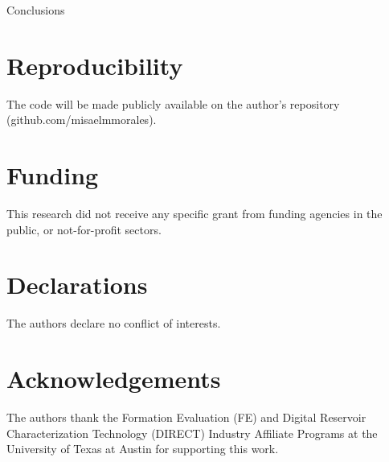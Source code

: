 \documentclass[10pt, twoside]{article}
\begin{document}
Conclusions

\section*{\textbf{Reproducibility}}
The code will be made publicly available on the author's repository (github.com/misaelmmorales).

\section*{\textbf{Funding}}
This research did not receive any specific grant from funding agencies in the public, or not-for-profit sectors.

\section*{\textbf{Declarations}}
The authors declare no conflict of interests.

\section*{\textbf{Acknowledgements}}
The authors thank the Formation Evaluation (FE) and Digital Reservoir Characterization Technology (DIRECT) Industry Affiliate Programs at the University of Texas at Austin for supporting this work.


\end{document}
